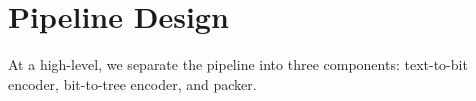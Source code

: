 \section[design]{Pipeline Design}

At a high-level, we separate the pipeline into three components: text-to-bit encoder, bit-to-tree encoder, and packer.